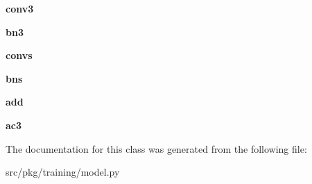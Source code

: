 \begin{DoxyCompactItemize}
{\bfseries conv3}
\item 
\mbox{\label{classrnb-planning_1_1src_1_1pkg_1_1training_1_1model_1_1_conv_block_a720d276532f552d13c669788ee4b180a}} 
{\bfseries bn3}
\item 
\mbox{\label{classrnb-planning_1_1src_1_1pkg_1_1training_1_1model_1_1_conv_block_a02cd17f80dfeae71d9b839c259051fa2}} 
{\bfseries convs}
\item 
\mbox{\label{classrnb-planning_1_1src_1_1pkg_1_1training_1_1model_1_1_conv_block_a266743a5b91dcd83e560438d2493ed41}} 
{\bfseries bns}
\item 
\mbox{\label{classrnb-planning_1_1src_1_1pkg_1_1training_1_1model_1_1_conv_block_a9685dd38ab2918d5715b4121801f105b}} 
{\bfseries add}
\item 
\mbox{\label{classrnb-planning_1_1src_1_1pkg_1_1training_1_1model_1_1_conv_block_a67733414a3fa1a5bc1ac8f6523c079a4}} 
{\bfseries ac3}
\end{DoxyCompactItemize}


The documentation for this class was generated from the following file\+:\begin{DoxyCompactItemize}
\item 
src/pkg/training/model.\+py\end{DoxyCompactItemize}
